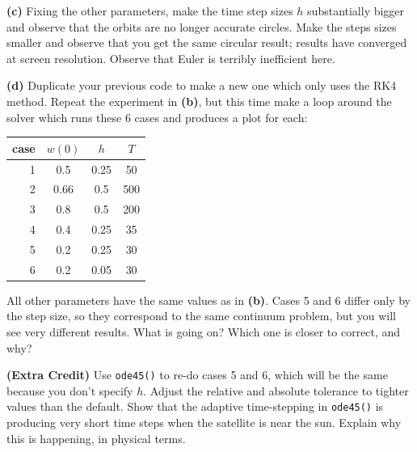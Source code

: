 \documentclass[12pt]{amsart}
\newcommand{\epart}[1]{\medskip\noindent\textbf{(#1)}\quad }
\begin{document}
\epart{c}  Fixing the other parameters, make the time step sizes $h$ substantially bigger and observe that the orbits are no longer accurate circles.  Make the steps sizes smaller and observe that you get the same circular result; results have converged at screen resolution.  Observe that Euler is terribly inefficient here.

\epart{d}  Duplicate your previous code to make a new one which only uses the RK4 method.  Repeat the experiment in \textbf{(b)}, but this time make a loop around the solver which runs these 6 cases and produces a plot for each:

\medskip
\begin{center}
\begin{tabular}{r|ccc}
case & $w(0)$ & $h$ & $T$ \\ \hline
1 & 0.5 & 0.25 & 50 \\
2 & 0.66 & 0.5 & 500 \\
3 & 0.8 & 0.5 & 200 \\
4 & 0.4 & 0.25 & 35 \\
5 & 0.2 & 0.25 & 30 \\
6 & 0.2 & 0.05 & 30
\end{tabular}
\end{center}

\medskip \noindent All other parameters have the same values as in \textbf{(b)}.  Cases 5 and 6 differ only by the step size, so they correspond to the same continuum problem, but you will see very different results.  What is going on?  Which one is closer to correct, and why?

\epart{Extra Credit}  Use \texttt{ode45()} to re-do cases 5 and 6, which will be the same because you don't specify $h$.  Adjust the relative and absolute tolerance to tighter values than the default.  Show that the adaptive time-stepping in \texttt{ode45()} is producing very short time steps when the satellite is near the sun.  Explain why this is happening, in physical terms.
\end{document}
